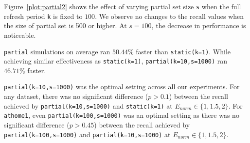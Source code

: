 Figure~\ref{plot:partial2} shows the effect of varying partial set size
\texttt{s} when the full refresh period \texttt{k} is fixed to $100$. We observe
no changes to the recall values when the size of partial set is 500 or higher. At
$s=100$, the decrease in performance is noticeable.

\texttt{partial} simulations on average ran $50.44\%$ faster than
\texttt{static(k=1)}. While achieving similar effectiveness as 
\texttt{static(k=1)}, \texttt{partial(k=10,s=1000)} ran $46.71\%$ faster.

\texttt{partial(k=10,s=1000)} was the optimal setting across all our
experiments.  For any dataset, there was no significant difference ($p > 0.1$)
between the recall achieved by \texttt{partial(k=10,s=1000)} and
\texttt{static(k=1)} at $E_{norm} \in \{1,1.5,2\}$. For \texttt{athome1}, even
\texttt{partial(k=100,s=1000)} was an optimal setting as there was no
significant difference ($p > 0.45$) between the recall achieved by
\texttt{partial(k=100,s=1000)} and \texttt{partial(k=10,s=1000)} at $E_{norm}
\in \{1,1.5,2\}$.

